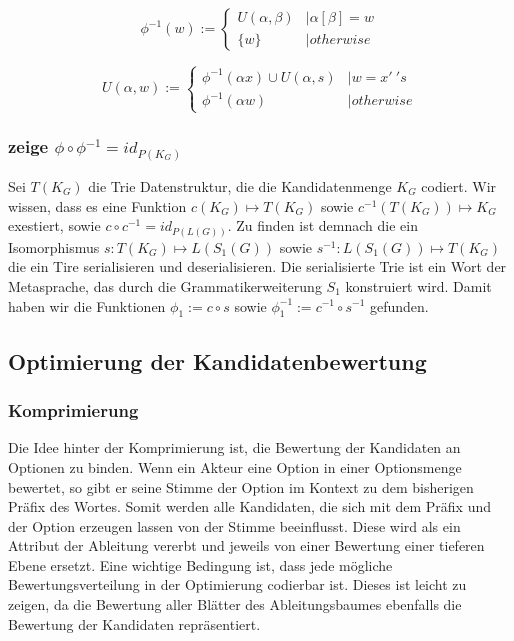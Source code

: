 \documentclass[]{article}
\begin{document}
\[ 
  \phi^{-1}(w) := 
  \begin{cases}
    U(\alpha, \beta) &| \alpha [ \beta ] = w \\
    \{ w \}   &| otherwise
  \end{cases}
\] 

\[ 
  U( \alpha, w ):= 
  \begin{cases}
    \phi^{-1}(\alpha x) \cup U(\alpha,s) &| w = x '\ ' s \\
    \phi^{-1}(\alpha w) &|otherwise
  \end{cases}
\] 

\subsubsection*{zeige $\phi\circ\phi^{-1} = id_{P(K_G)}$}

Sei $T(K_G)$ die Trie Datenstruktur, die die Kandidatenmenge $K_G$ codiert.
Wir wissen, dass es eine Funktion $c(K_G)\mapsto T(K_G)$ sowie $c^{-1}(T(K_G)) \mapsto K_G$ exestiert, sowie $c\circ c^{-1} = id_{P(L(G))}$. Zu finden ist demnach die ein Isomorphismus $s: T(K_G) \mapsto L(S_1(G))$ sowie $s^{-1}: L(S_1(G)) \mapsto T(K_G)$ die ein Tire serialisieren und deserialisieren. Die serialisierte Trie ist ein Wort der Metasprache, das durch die Grammatikerweiterung $S_1$ konstruiert wird. Damit haben wir die Funktionen $\phi_1 := c \circ s$ sowie $\phi_1^{-1} := c^{-1} \circ s^{-1}$ gefunden. 
  

\subsection{Optimierung der Kandidatenbewertung}

\subsubsection*{Komprimierung}
Die Idee hinter der Komprimierung ist, die Bewertung der Kandidaten an Optionen zu binden. Wenn ein Akteur eine Option in einer Optionsmenge bewertet, so gibt er seine Stimme der Option im Kontext zu dem bisherigen Präfix des Wortes. Somit werden alle Kandidaten, die sich mit dem Präfix und der Option erzeugen lassen von der Stimme beeinflusst. Diese wird als ein Attribut der Ableitung vererbt\cite{Knuth1968} und jeweils von einer Bewertung einer tieferen Ebene ersetzt. Eine wichtige Bedingung ist, dass jede mögliche Bewertungsverteilung in der Optimierung codierbar ist. Dieses ist leicht zu zeigen, da die Bewertung aller Blätter des Ableitungsbaumes ebenfalls die Bewertung der Kandidaten repräsentiert.
\end{document}
